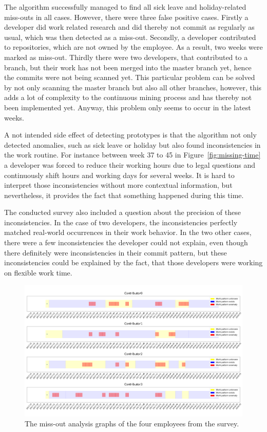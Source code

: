 The algorithm successfully managed to find all sick leave and holiday-related miss-outs in all cases.
However, there were three false positive cases.
Firstly a developer did work related research and did thereby not commit as regularly as usual, which was then detected as a miss-out.
Secondly, a developer contributed to repositories, which are not owned by the employee.
As a result, two weeks were marked as miss-out.
Thirdly there were two developers, that contributed to a branch, but their work has not been merged into the master branch yet, hence the commits were not being scanned yet.
This particular problem can be solved by not only scanning the master branch but also all other branches, however, this adds a lot of complexity to the continuous mining process and has thereby not been implemented yet.
Anyway, this problem only seems to occur in the latest weeks.

A not intended side effect of detecting prototypes is that the algorithm not only detected anomalies, such as sick leave or holiday but also found inconsistencies in the work routine.
For instance between week 37 to 45 in Figure~\ref{fig:missing-time} a developer was forced to reduce their working hours due to legal questions and continuously shift hours and working days for several weeks.
It is hard to interpret those inconsistencies without more contextual information, but nevertheless, it provides the fact that something happened during this time.

The conducted survey also included a question about the precision of these inconsistencies.
In the case of two developers, the inconsistencies perfectly matched real-world occurrences in their work behavior.
In the two other cases, there were a few inconsistencies the developer could not explain, even though there definitely were inconsistencies in their commit pattern, but these inconsistencies could be explained by the fact, that those developers were working on flexible work time.

\begin{figure}[H]
    \includegraphics[scale=0.20]{./graphs/analysis/work-time-analysis-comparison}
    \centering
    \caption{The miss-out analysis graphs of the four employees from the survey.}\label{fig:miss-out-comparison}
\end{figure}

